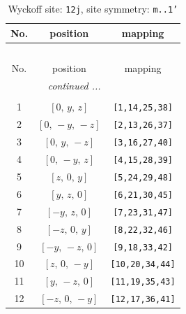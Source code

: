 \documentclass[fleqn,8pt]{jsarticle}
\begin{document}
\begin{longtable}{ccc}
\caption{Wyckoff site: {\tt 12j}, site symmetry: {\tt m..1'}}
 \\
 \hline \hline
No. & position & mapping \\ \hline \endfirsthead

\multicolumn{2}{l}{\tablename\ \thetable{}} \\
 \hline \hline
No. & position & mapping \\ \hline \endhead

 \hline \hline
\multicolumn{2}{r}{\footnotesize\it continued ...} \\ \endfoot

 \hline \hline
\multicolumn{2}{r}{} \\ \endlastfoot

1 & $\left[ 0,\, y,\, z \right]$ & {\tt [1,14,25,38]} \\ \hline
2 & $\left[ 0,\, - y,\, - z \right]$ & {\tt [2,13,26,37]} \\ \hline
3 & $\left[ 0,\, y,\, - z \right]$ & {\tt [3,16,27,40]} \\ \hline
4 & $\left[ 0,\, - y,\, z \right]$ & {\tt [4,15,28,39]} \\ \hline
5 & $\left[ z,\, 0,\, y \right]$ & {\tt [5,24,29,48]} \\ \hline
6 & $\left[ y,\, z,\, 0 \right]$ & {\tt [6,21,30,45]} \\ \hline
7 & $\left[ - y,\, z,\, 0 \right]$ & {\tt [7,23,31,47]} \\ \hline
8 & $\left[ - z,\, 0,\, y \right]$ & {\tt [8,22,32,46]} \\ \hline
9 & $\left[ - y,\, - z,\, 0 \right]$ & {\tt [9,18,33,42]} \\ \hline
10 & $\left[ z,\, 0,\, - y \right]$ & {\tt [10,20,34,44]} \\ \hline
11 & $\left[ y,\, - z,\, 0 \right]$ & {\tt [11,19,35,43]} \\ \hline
12 & $\left[ - z,\, 0,\, - y \right]$ & {\tt [12,17,36,41]} \\
\end{longtable}
\renewcommand{\arraystretch}{1.2}
\end{document}
